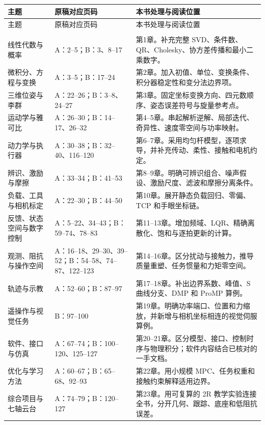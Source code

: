 \begin{longtable}{>{\raggedright\arraybackslash}p{30mm}>{\raggedright\arraybackslash}p{54mm}>{\raggedright\arraybackslash}p{70mm}}
\toprule
主题 & 原稿对应页码 & 本书处理与阅读位置\\
\midrule
\endfirsthead
\toprule 主题 & 原稿对应页码 & 本书处理与阅读位置\\\midrule
\endhead
\midrule\multicolumn{3}{r}{接下页}\\\endfoot
\bottomrule\endlastfoot
线性代数与概率 & A：2--5；B：3、8--17 & 第1章。补充完整 SVD、条件数、QR、Cholesky、协方差传播和最小二乘数字。\\
微积分、方程与变换 & A：3--5；B：17--24 & 第2章。加入初值、单位、变换条件、积分器稳定性和变分法边界项。\\
三维位姿与李群 & A：22--26；B：3--8、24--27 & 第3章。固定坐标变换方向、四元数顺序、姿态误差符号与旋量参考点。\\
运动学与雅可比 & A：26--30；B：14--17、26--32 & 第4--5章。串起解析逆解、局部迭代、奇异性、速度零空间与功率映射。\\
动力学与执行器 & A：30--38；B：32--40、116--120 & 第6--7章。采用均匀杆模型，逐项求导，并补充传动、柔性、接触和电机约定。\\
辨识、激励与摩擦 & A：33--34；B：41--53 & 第8--9章。明确可辨识组合、噪声假设、激励尺度、滤波和摩擦分离条件。\\
负载、工具与相机标定 & A：22--30；B：44--50 & 第10章。展开静态负载回归、零偏、TCP 和手眼坐标链。\\
反馈、状态空间与数字控制 & A：5--22、34--43；B：59--74、78--83 & 第11--13章。增加频域、LQR、精确离散化、饱和与逐拍更新的计算。\\
观测、阻抗与操作空间 & A：16--18、29--30、39--52；B：54--58、74--87、122--123 & 第14--16章。区分扰动与接触力，推导质量重塑、任务惯量和力矩零空间。\\
轨迹与示教 & A：52--60；B：87--97 & 第17--18章。补出边界系数、峰值、S 曲线分支、DMP 和 ProMP 算例。\\
遥操作与视觉任务 & B：97--100 & 第19章。明确功率端口、位置和力缩放，并新增与相机坐标相连的视觉伺服算例。\\
软件、接口与仿真 & A：67--74；B：100--120、125--127 & 第20--21章。区分模型、接口、控制时序与物理积分；软件内容结合已核对的一手文档。\\
优化与学习方法 & A：60--67；B：65--68、92--93 & 第22章。用小规模 MPC、任务权重和接触约束解释适用边界。\\
综合项目与七轴云台 & A：74--79；B：120--127 & 第23章。用可复算的 2R 教学实验连接全书，分开几何、跟踪、底座和低阻抗误差。\\
\end{longtable}
\endgroup

